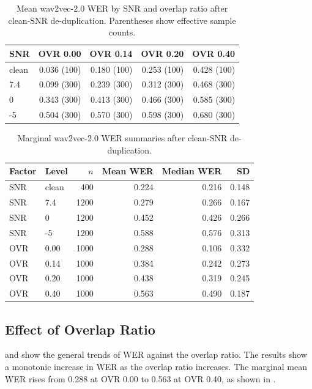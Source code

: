 \begin{table}[htbp]
\centering
\caption{Mean wav2vec-2.0 WER by SNR and overlap ratio after clean-SNR de-duplication. Parentheses show effective sample counts.}
\label{tab:wav2vec2_snr_overlap_mean_wer}
\begin{tabular}{lrrrr}
\toprule
\textbf{SNR} & \textbf{OVR 0.00} & \textbf{OVR 0.14} & \textbf{OVR 0.20} & \textbf{OVR 0.40} \\
\midrule
clean & 0.036 (100) & 0.180 (100) & 0.253 (100) & 0.428 (100) \\
7.4 & 0.099 (300) & 0.239 (300) & 0.312 (300) & 0.468 (300) \\
0 & 0.343 (300) & 0.413 (300) & 0.466 (300) & 0.585 (300) \\
-5 & 0.504 (300) & 0.570 (300) & 0.598 (300) & 0.680 (300) \\
\bottomrule
\end{tabular}
\end{table}

\begin{table}[htbp]
\centering
\caption{Marginal wav2vec-2.0 WER summaries after clean-SNR de-duplication.}
\label{tab:wav2vec2_marginal_wer}
\begin{tabular}{llrrrr}
\toprule
\textbf{Factor} & \textbf{Level} & \textbf{$n$} & \textbf{Mean WER} & \textbf{Median WER} & \textbf{SD} \\
\midrule
SNR & clean & 400 & 0.224 & 0.216 & 0.148 \\
SNR & 7.4 & 1200 & 0.279 & 0.266 & 0.167 \\
SNR & 0 & 1200 & 0.452 & 0.426 & 0.266 \\
SNR & -5 & 1200 & 0.588 & 0.576 & 0.313 \\
\midrule
OVR & 0.00 & 1000 & 0.288 & 0.106 & 0.332 \\
OVR & 0.14 & 1000 & 0.384 & 0.242 & 0.273 \\
OVR & 0.20 & 1000 & 0.438 & 0.319 & 0.245 \\
OVR & 0.40 & 1000 & 0.563 & 0.490 & 0.187 \\
\bottomrule
\end{tabular}
\end{table}

\subsection{Effect of Overlap Ratio}
 and  show the general trends of WER against the overlap ratio. The results show a monotonic increase in WER as the overlap ratio increases. The marginal mean WER rises from 0.288 at OVR 0.00 to 0.563 at OVR 0.40, as shown in .

